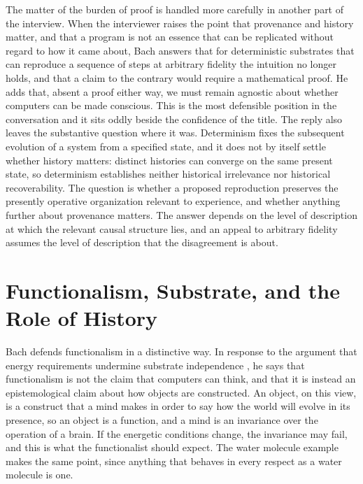\documentclass[11pt]{article}
\begin{document}
The matter of the burden of proof is handled more carefully in another part of the interview. When the interviewer raises the point that provenance and history matter, and that a program is not an essence that can be replicated without regard to how it came about, Bach answers that for deterministic substrates that can reproduce a sequence of steps at arbitrary fidelity the intuition no longer holds, and that a claim to the contrary would require a mathematical proof. He adds that, absent a proof either way, we must remain agnostic about whether computers can be made conscious. This is the most defensible position in the conversation and it sits oddly beside the confidence of the title. The reply also leaves the substantive question where it was. Determinism fixes the subsequent evolution of a system from a specified state, and it does not by itself settle whether history matters: distinct histories can converge on the same present state, so determinism establishes neither historical irrelevance nor historical recoverability. The question is whether a proposed reproduction preserves the presently operative organization relevant to experience, and whether anything further about provenance matters. The answer depends on the level of description at which the relevant causal structure lies, and an appeal to arbitrary fidelity assumes the level of description that the disagreement is about.

\section{Functionalism, Substrate, and the Role of History}

Bach defends functionalism in a distinctive way. In response to the argument that energy requirements undermine substrate independence \cite{thagard2022}, he says that functionalism is not the claim that computers can think, and that it is instead an epistemological claim about how objects are constructed. An object, on this view, is a construct that a mind makes in order to say how the world will evolve in its presence, so an object is a function, and a mind is an invariance over the operation of a brain. If the energetic conditions change, the invariance may fail, and this is what the functionalist should expect. The water molecule example makes the same point, since anything that behaves in every respect as a water molecule is one.
\end{document}
